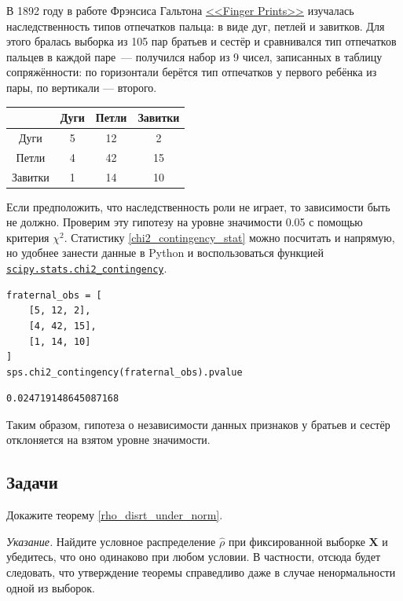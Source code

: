 \begin{example}
	В 1892 году в работе Фрэнсиса Гальтона \href{https://galton.org/books/finger-prints/index.htm}{<<Finger Prints>>} изучалась наследственность типов отпечатков пальца: в виде дуг, петлей и завитков. Для этого бралась выборка из 105 пар братьев и сестёр и сравнивался тип отпечатков пальцев в каждой паре~--- получился набор из 9 чисел, записанных в таблицу сопряжённости: по горизонтали берётся тип отпечатков у первого ребёнка из пары, по вертикали --- второго.
	\begin{center}
		\begin{tabular}{|c|c|c|c|}
		\hline
			 & Дуги & Петли & Завитки \\
			\hline
			Дуги & 5 & 12 & 2 \\
			\hline
			Петли & 4 & 42 & 15 \\
			\hline
			Завитки & 1 & 14 & 10 \\
			\hline
		\end{tabular}
	\end{center}
	
	Если предположить, что наследственность роли не играет, то зависимости быть не должно. Проверим эту гипотезу на уровне значимости 0.05 с помощью критерия $\chi^2$. Статистику \eqref{chi2_contingency_stat} можно посчитать и напрямую, но удобнее занести данные в Python и воспользоваться функцией \href{https://docs.scipy.org/doc/scipy/reference/generated/scipy.stats.chi2\_contingency.html}{\texttt{scipy.stats.chi2\_contingency}}. 
	\begin{verbatim}
fraternal_obs = [
    [5, 12, 2],
    [4, 42, 15],
    [1, 14, 10]
]
sps.chi2_contingency(fraternal_obs).pvalue
	\end{verbatim}
	\begin{lstlisting}
0.024719148645087168
	\end{lstlisting}
	
	Таким образом, гипотеза о независимости данных признаков у братьев и сестёр отклоняется на взятом уровне значимости.
\end{example}

\subsection*{Задачи}

\begin{problem}
	Докажите теорему \ref{rho_disrt_under_norm}.
	
	\textit{Указание.} Найдите условное распределение $\widehat{\rho}$ при фиксированной выборке $\mathbf{X}$ и убедитесь, что оно одинаково при любом условии. В частности, отсюда будет следовать, что утверждение теоремы справедливо даже в случае ненормальности одной из выборок.
\end{problem}

